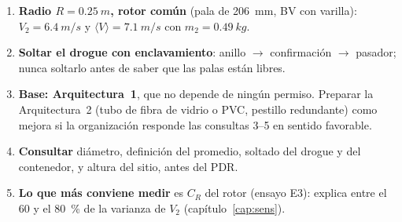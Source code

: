 \begin{resultado}[Recomendación]
\begin{enumerate}[leftmargin=*]
  \item \textbf{Radio $R=\SI{0.25}{m}$, rotor común} (pala de \SI{206}{mm}, BV con varilla): $V_2=\SI{6.4}{m/s}$
        y $\langle V\rangle=\SI{7.1}{m/s}$ con $m_2=\SI{0.49}{kg}$.
  \item \textbf{Soltar el drogue con enclavamiento}: anillo $\to$ confirmación $\to$ pasador;
        nunca soltarlo antes de saber que las palas están libres.
  \item \textbf{Base: Arquitectura~1}, que no depende de ningún permiso. Preparar la
        Arquitectura~2 (tubo de fibra de vidrio o PVC, pestillo redundante) como mejora si la
        organización responde las consultas 3--5 en sentido favorable.
  \item \textbf{Consultar} diámetro, definición del promedio, soltado del drogue y del
        contenedor,  y altura del sitio, antes del PDR.
  \item \textbf{Lo que más conviene medir} es $C_R$ del rotor (ensayo E3): explica entre el 60 y
        el \SI{80}{\percent} de la varianza de $V_2$ (capítulo~\ref{cap:sens}).
\end{enumerate}
\end{resultado}
